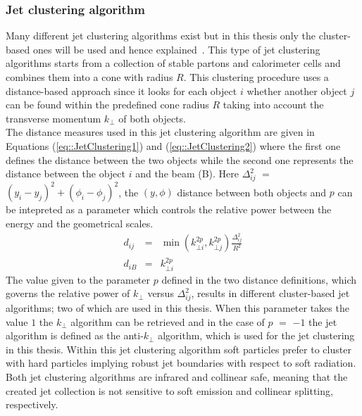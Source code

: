 \subsubsection*{Jet clustering algorithm}
Many different jet clustering algorithms exist but in this thesis only the cluster-based ones will be used and hence explained~\cite{}. This type of jet clustering algorithms starts from a collection of stable partons and calorimeter cells and combines them into a cone with radius $R$. This clustering procedure uses a distance-based approach since it looks for each object $i$ whether another object $j$ can be found within the predefined cone radius $R$ taking into account the transverse momentum $k_{\bot}$ of both objects.
\\
The distance measures used in this jet clustering algorithm are given in Equations (\ref{eq::JetClustering1}) and (\ref{eq::JetClustering2}) where the first one defines the distance between the two objects while the second one represents the distance between the object $i$ and the beam (B). Here $\Delta_{ij}^{2}$ $=$ $(y_i - y_j)^{2} + (\phi_i - \phi_j)^2$, the $(y,\phi)$ distance between both objects and $p$ can be intepreted as a parameter which controls the relative power between the energy and the geometrical scales.
\\
\begin{eqnarray}
 d_{ij} & = & \min(k_{\bot i}^{2p}, k_{\bot j}^{2p}) \frac{\Delta_{ij}^{2}}{R^{2}} \label{eq::JetClustering1} \\
 d_{iB} & = & k_{\bot i}^{2p}                                                      \label{eq::JetClustering2}
\end{eqnarray}
The value given to the parameter $p$ defined in the two distance definitions, which governs the relative power of $k_{\bot}$ versus $\Delta_{ij}^{2}$, results in different cluster-based jet algorithms; two of which are used in this thesis. When this parameter takes the value $1$ the $k_{\bot}$ algorithm can be retrieved and in the case of $p$ $=$ $-1$ the jet algorithm is defined as the anti-$k_{\bot}$ algorithm, which is used for the jet clustering in this thesis. %
Within this jet clustering algorithm soft particles prefer to cluster with hard particles implying robust jet boundaries with respect to soft radiation. Both jet clustering algorithms are infrared and collinear safe, meaning that the created jet collection is not sensitive to soft emission and collinear splitting, respectively.
\\

